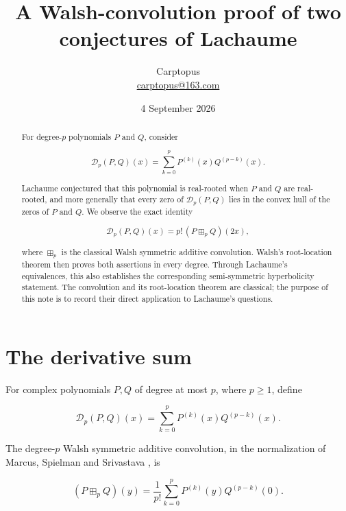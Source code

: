 \documentclass[11pt]{article}
\title{A Walsh-convolution proof of two conjectures of Lachaume}
\author{Carptopus\\\href{mailto:carptopus@163.com}{carptopus@163.com}}
\date{4 September 2026}
\begin{document}
\maketitle

\begin{center}
\end{center}

\begin{abstract}


For degree-\(p\) polynomials \(P\) and \(Q\), consider

\[
\mathcal D_p(P,Q)(x)=\sum_{k=0}^{p}P^{(k)}(x)Q^{(p-k)}(x).
\]

Lachaume conjectured that this polynomial is real-rooted when \(P\) and \(Q\)
are real-rooted, and more generally that every zero of \(\mathcal D_p(P,Q)\)
lies in the convex hull of the zeros of \(P\) and \(Q\). We observe the exact
identity

\[
\mathcal D_p(P,Q)(x)=p!\,(P\boxplus_p Q)(2x),
\]

where \(\boxplus_p\) is the classical Walsh symmetric additive convolution.
Walsh's root-location theorem then proves both assertions in every degree.
Through Lachaume's equivalences, this also establishes the corresponding
semi-symmetric hyperbolicity statement. The convolution and its root-location
theorem are classical; the purpose of this note is to record their direct
application to Lachaume's questions.

\end{abstract}

\section{The derivative sum}


For complex polynomials \(P,Q\) of degree at most \(p\), where \(p\ge 1\),
define

\[
\mathcal D_p(P,Q)(x)
=\sum_{k=0}^{p}P^{(k)}(x)Q^{(p-k)}(x).
\]

The degree-\(p\) Walsh symmetric additive convolution, in the normalization of
Marcus, Spielman and Srivastava \cite{mss}, is

\[
(P\boxplus_p Q)(y)
=\frac1{p!}\sum_{k=0}^{p}P^{(k)}(y)Q^{(p-k)}(0).
\]
\end{document}
